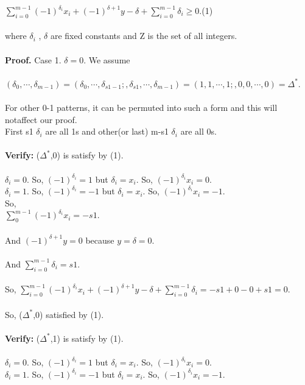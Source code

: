 \documentclass{article}
\begin{document}
$\sum_{i=0}^{m-1}(-1)^{\delta_i}x_i + (-1)^{\delta+1}y - \delta + \sum_{i=0}^{m-1}\delta_i \ge 0.$\hspace{7cm}(1)\\\\
where  $\delta_i$ , $\delta$ are fixed constants and Z is the set of all integers.\\\\
\textbf{Proof.} Case 1. $\delta = 0$. We assume\\\\
$(\delta_0,\cdots,\delta_{m-1}) = (\delta_0,\cdots,\delta_{s1-1};,\delta_{s1},\cdots,\delta_{m-1}) = (1,1,\cdots,1;,0,0,\cdots,0) = \Delta^*$.\\\\
For other 0-1 patterns, it can be permuted into such a form and this will notaffect our proof.\\
First s1 $\delta_i$ are all 1s and other(or last) m-s1 $\delta_i$ are all 0s.\\\\
\textbf{Verify:} ($\Delta^*$,0) is satisfy by (1).\\\\
$\delta_i = 0$.  So, $(-1)^{\delta_i} = 1$ but $\delta_i = x_i$. So, $(-1)^{\delta_i}x_i = 0$.\\
$\delta_i = 1$.  So, $(-1)^{\delta_i} = -1$ but $\delta_i = x_i$. So, $(-1)^{\delta_i}x_i = -1$.\\
So,\\ $\sum_{0}^{m-1}(-1)^{\delta_i}x_i = -s1$.\\\\
And $(-1)^{\delta+1}y=0$ because $y = \delta = 0$.\\\\
And $\sum_{i=0}^{m-1}\delta_i = s1$.\\\\
So,  $\sum_{i=0}^{m-1}(-1)^{\delta_i}x_i + (-1)^{\delta+1}y - \delta + \sum_{i=0}^{m-1}\delta_i = -s1 + 0 - 0 + s1 = 0.$\\\\
So, ($\Delta^*$,0)  satisfied by (1).\\\\
\textbf{Verify:} ($\Delta^*$,1) is satisfy by (1).\\\\
$\delta_i = 0$.  So, $(-1)^{\delta_i} = 1$ but $\delta_i = x_i$. So, $(-1)^{\delta_i}x_i = 0$.\\
$\delta_i = 1$.  So, $(-1)^{\delta_i} = -1$ but $\delta_i = x_i$. So, $(-1)^{\delta_i}x_i = -1$.\\
\end{document}
